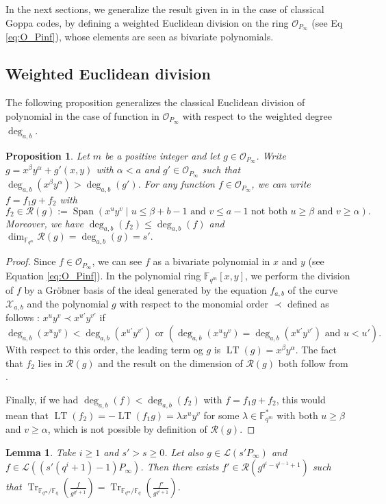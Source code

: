 \documentclass[a4paper]{amsart}
\newtheorem{proposition}[thm]{Proposition}
\newtheorem{lemma}[thm]{Lemma}
\theoremstyle{definition}
\theoremstyle{remark}
\newcommand{\calL}{\mathcal{L}}
\newcommand{\calO}{\mathcal{O}}
\newcommand{\calR}{\mathcal{R}}
\newcommand{\calX}{\mathcal{X}}
\newcommand{\fqm}{\mathbb{F}_{q^m}}
\newcommand{\fq}{\mathbb{F}_{q}}
\newcommand{\F}{\mathbb{F}}
\newcommand{\Tr}[1]{\operatorname{Tr}_{\mathbb{F}_{q^m}/\fq}\left(#1\right)}
\newcommand{\Span}[1]{\operatorname{Span}\left(#1\right)}
\newcommand{\LT}[1]{\operatorname{LT}\left(#1\right)}
\newcommand{\degab}[1]{\deg_{a,b}\left(#1\right)}
\begin{document}
\noindent In the next sections, we generalize the result given in \cite{MT21} in the case of classical Goppa codes, by defining a weighted Euclidean division on the ring $\calO_{P_\infty}$ (see Eq \eqref{eq:O_Pinf}), whose elements are seen as bivariate polynomials. 
\subsection{Weighted Euclidean division}
\noindent The following proposition generalizes the classical Euclidean division of polynomial in the case of function in $\calO_{P_\infty}$ with respect to the weighted degree $\deg_{a,b}$.

\begin{proposition}\label{prop:div_grob}
Let $m$ be a positive integer and let $g \in \calO_{P_\infty}$. Write $g=x^\beta y^\alpha +g'(x,y)$ with $\alpha < a$ and $g' \in \calO_{P_\infty}$ such that $\degab{x^\beta y^\alpha}>\degab{g'}$.
For any function $f \in \calO_{P_\infty}$, we can write $f=f_1g+f_2$ with 
\[f_2 \in \calR(g):= \Span{x^u y^v \mid u \leq \beta + b-1 \text{ and } v\leq a-1 \text{ not both }  u \geq \beta \text{ and } v \geq \alpha}.\]
Moreover, we have $\degab{f_2} \leq \degab{f}$ and $\dim_{\fqm} \calR(g) = \degab{g}=s'.$ 
\end{proposition}

\begin{proof}
  Since $f \in \calO_{P_\infty}$, we can see $f$ as a bivariate polynomial in $x$ and $y$ (see Equation \ref{eq:O_Pinf}). In the polynomial ring $\F_{q^m}[x,y]$, we perform the division of $f$ by a Gr\"obner basis of the ideal generated by the equation $f_{a,b}$ of the curve $\calX_{a,b}$ and the polynomial $g$ with respect to the monomial order $\prec$ defined as follows : $x^uy^v \prec x^{u'}y^{v'}$ if
 \[ \degab{x^uy^v} < \degab{x^{u'}y^{v'}} \text{ or } \left(\degab{x^uy^v} = \degab{x^{u'}y^{v'}}  \text{ and } u < u'\right).\]
 With respect to this order, the leading term og $g$ is $\LT{g}=x^\beta y^\alpha$. The fact that $f_2$ lies in $\calR(g)$ and the result on the dimension of $\calR(g)$ both follow from \cite[Proposition 4]{GH00}.
 
 Finally, if we had $\degab{f} < \degab{f_2}$ with $f=f_1 g +f_2$, this would mean that $\LT{f_2}=-\LT{f_1 g}=\lambda x^uy^v$ for some $\lambda \in \F_{q^m}^*$ with both $u \geq \beta$ and $v \geq \alpha$, which is not possible by definition of $\calR\left(g\right)$.
\end{proof}

\begin{lemma} \label{lem:weighted_division}
Take $i \geq 1$ and $s'>s \geq 0$. Let also $g \in \calL\left(s'P_\infty\right)$ and $f \in \calL\left(\left(s'(q^i+1)-1\right)P_\infty\right)$. Then there exists $f' \in \calR\left(g^{q^i-q^{i-1}+1}\right)$ such that $\Tr{\frac{f}{g^{q^i+1}}} = \Tr{\frac{f'}{g^{q^i+1}}} $.
\end{lemma}
\end{document}
